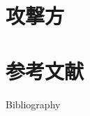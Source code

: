 \documentclass[14pt,xcolor=dvipsnames,table,dvipdfmx]{beamer}
\begin{document}
\section{攻撃方}
\begin{frame}
\end{frame}
\begin{frame}
\end{frame}
\begin{frame}
\end{frame}

\section{参考文献}
\begin{frame}[t,allowframebreaks]{Bibliography}
\fontsize{8pt}{7.2}\selectfont


\end{frame}
\end{document}
